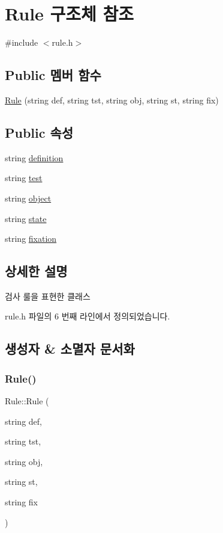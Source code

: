 \hypertarget{struct_rule}{}\section{Rule 구조체 참조}
\label{struct_rule}


{\ttfamily \#include $<$rule.\+h$>$}

\subsection*{Public 멤버 함수}
\begin{DoxyCompactItemize}
\item 
\hyperlink{struct_rule_a89b0df02f058414f1174e4a8d1a42144}{Rule} (string def, string tst, string obj, string st, string fix)
\end{DoxyCompactItemize}
\subsection*{Public 속성}
\begin{DoxyCompactItemize}
\item 
string \hyperlink{struct_rule_a0b8d9364680bd6b50577c8be0d14903b}{definition}
\item 
string \hyperlink{struct_rule_abbeb0189b257493fd9d06c8c7c85ba58}{test}
\item 
string \hyperlink{struct_rule_a96fb9817712ad0b33d4e407be0257b5c}{object}
\item 
string \hyperlink{struct_rule_ad8a0f697b716c6f7607bda36887009ef}{state}
\item 
string \hyperlink{struct_rule_aee3e02b0da6debc39e4e7806c6d36338}{fixation}
\end{DoxyCompactItemize}


\subsection{상세한 설명}
검사 룰을 표현한 클래스 

rule.\+h 파일의 6 번째 라인에서 정의되었습니다.



\subsection{생성자 \& 소멸자 문서화}
\mbox{\label{struct_rule_a89b0df02f058414f1174e4a8d1a42144}} 
\subsubsection{\texorpdfstring{Rule()}{Rule()}}
{\footnotesize\ttfamily Rule\+::\+Rule (\begin{DoxyParamCaption}\item[{string}]{def,  }\item[{string}]{tst,  }\item[{string}]{obj,  }\item[{string}]{st,  }\item[{string}]{fix }\end{DoxyParamCaption})\hspace{0.3cm}{\ttfamily [inline]}}

